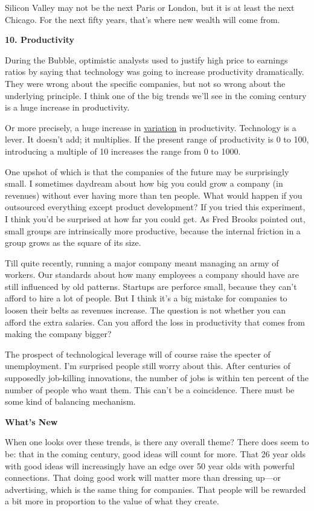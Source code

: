 \documentclass[12pt]{book}
\begin{document}
Silicon Valley may not be the next Paris or London, but it is at least
the next Chicago. For the next fifty years, that's where new wealth will
come from.

\textbf{10. Productivity}

During the Bubble, optimistic analysts used to justify high price to
earnings ratios by saying that technology was going to increase
productivity dramatically. They were wrong about the specific companies,
but not so wrong about the underlying principle. I think one of the big
trends we'll see in the coming century is a huge increase in
productivity.

Or more precisely, a huge increase in \href{gh.html}{variation} in
productivity. Technology is a lever. It doesn't add; it multiplies. If
the present range of productivity is 0 to 100, introducing a multiple of
10 increases the range from 0 to 1000.

One upshot of which is that the companies of the future may be
surprisingly small. I sometimes daydream about how big you could grow a
company (in revenues) without ever having more than ten people. What
would happen if you outsourced everything except product development? If
you tried this experiment, I think you'd be surprised at how far you
could get. As Fred Brooks pointed out, small groups are intrinsically
more productive, because the internal friction in a group grows as the
square of its size.

Till quite recently, running a major company meant managing an army of
workers. Our standards about how many employees a company should have
are still influenced by old patterns. Startups are perforce small,
because they can't afford to hire a lot of people. But I think it's a
big mistake for companies to loosen their belts as revenues increase.
The question is not whether you can afford the extra salaries. Can you
afford the loss in productivity that comes from making the company
bigger?

The prospect of technological leverage will of course raise the specter
of unemployment. I'm surprised people still worry about this. After
centuries of supposedly job-killing innovations, the number of jobs is
within ten percent of the number of people who want them. This can't be
a coincidence. There must be some kind of balancing mechanism.

\textbf{What's New}

When one looks over these trends, is there any overall theme? There does
seem to be: that in the coming century, good ideas will count for more.
That 26 year olds with good ideas will increasingly have an edge over 50
year olds with powerful connections. That doing good work will matter
more than dressing up---or advertising, which is the same thing for
companies. That people will be rewarded a bit more in proportion to the
value of what they create.
\end{document}
